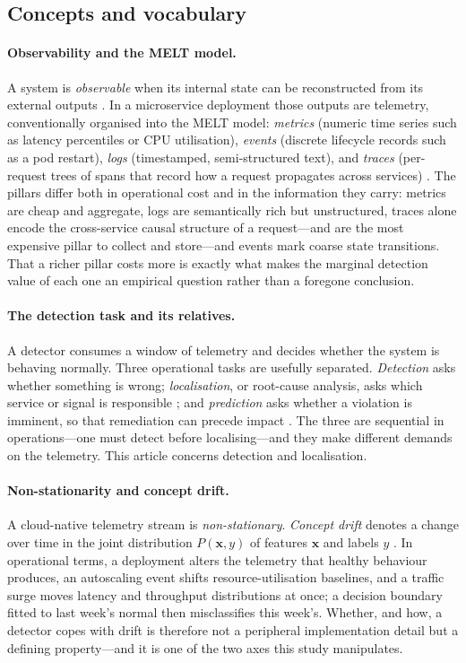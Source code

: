 \documentclass[pdflatex,sn-mathphys-num]{sn-jnl}%
\theoremstyle{thmstyleone}%
\theoremstyle{thmstyletwo}%
\theoremstyle{thmstylethree}%
\begin{document}
\subsection{Concepts and vocabulary}\label{sec:fnd-concepts}

\paragraph{Observability and the MELT model.} A system is \emph{observable} when its internal state can be reconstructed from its external outputs \cite{kosinska2023}. In a microservice deployment those outputs are telemetry, conventionally organised into the MELT model: \emph{metrics} (numeric time series such as latency percentiles or CPU utilisation), \emph{events} (discrete lifecycle records such as a pod restart), \emph{logs} (timestamped, semi-structured text), and \emph{traces} (per-request trees of spans that record how a request propagates across services) \cite{boten2022,chapman2023}. The pillars differ both in operational cost and in the information they carry: metrics are cheap and aggregate, logs are semantically rich but unstructured, traces alone encode the cross-service causal structure of a request---and are the most expensive pillar to collect and store---and events mark coarse state transitions. That a richer pillar costs more is exactly what makes the marginal detection value of each one an empirical question rather than a foregone conclusion.

\paragraph{The detection task and its relatives.} A detector consumes a window of telemetry and decides whether the system is behaving normally. Three operational tasks are usefully separated. \emph{Detection} asks whether something is wrong; \emph{localisation}, or root-cause analysis, asks which service or signal is responsible \cite{han2024}; and \emph{prediction} asks whether a violation is imminent, so that remediation can precede impact \cite{mart2020}. The three are sequential in operations---one must detect before localising---and they make different demands on the telemetry. This article concerns detection and localisation.

\paragraph{Non-stationarity and concept drift.} A cloud-native telemetry stream is \emph{non-stationary}. \emph{Concept drift} denotes a change over time in the joint distribution $P(\mathbf{x}, y)$ of features $\mathbf{x}$ and labels $y$ \cite{arora2024drift,lukats2025drift}. In operational terms, a deployment alters the telemetry that healthy behaviour produces, an autoscaling event shifts resource-utilisation baselines, and a traffic surge moves latency and throughput distributions at once; a decision boundary fitted to last week's normal then misclassifies this week's. Whether, and how, a detector copes with drift is therefore not a peripheral implementation detail but a defining property---and it is one of the two axes this study manipulates.
\end{document}
